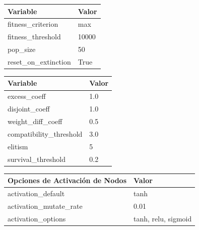 \documentclass[conference]{IEEEtran}
\begin{document}
\begin{table}[H]
    \centering
    \label{tab:NEAT}
    \begin{tabular}{ll}
    \toprule
    \textbf{Variable} & \textbf{Valor} \\
    \midrule
    fitness\_criterion     & max \\
    fitness\_threshold     & 10000 \\
    pop\_size              & 50 \\
    reset\_on\_extinction  & True  \\
    \bottomrule
    \end{tabular}
    \vspace{0.5cm}
    
    \label{tab:DefaultReproduction}
    \begin{tabular}{ll}
    \toprule
    \textbf{Variable} & \textbf{Valor} \\
    \midrule
    excess\_coeff            & 1.0 \\
    disjoint\_coeff          & 1.0 \\
    weight\_diff\_coeff      & 0.5 \\
    compatibility\_threshold & 3.0 \\
    elitism                  & 5 \\
    survival\_threshold      & 0.2 \\
    \bottomrule
    \end{tabular}
    \vspace{0.5cm}

    \label{tab:DefaultGenome_1}
    \begin{tabular}{ll}
    \toprule
    \textbf{Opciones de Activación de Nodos} & \textbf{Valor} \\
    \midrule
    activation\_default       & tanh \\
    activation\_mutate\_rate  & 0.01 \\
    activation\_options       & tanh, relu, sigmoid \\
    \bottomrule
    \end{tabular}

\end{table}

    
\end{document}
